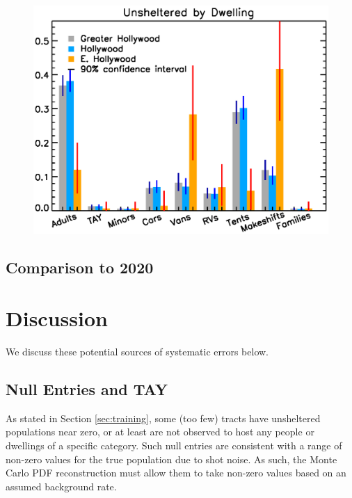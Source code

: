 \documentclass[11pt,twocolumn]{article}
\begin{document}
\begin{figure}[h]
	\centering
	\includegraphics[width =\linewidth]{allTracts/allBreakdownBar}
	\caption{}
\end{figure}

\subsection{Comparison to 2020}
\label{sec:comp}

\section{Discussion}
\label{sec:discussion}

We discuss these potential sources of systematic errors below.

\subsection{Null Entries and TAY}
\label{sec:nulls}

As stated in Section \ref{sec:training}, some (too few) tracts have unsheltered populations near zero, 
or at least are not observed to host any people or dwellings of a specific category. Such null entries 
are consistent with a range of non-zero values for the true population due to shot noise. As such, the 
Monte Carlo PDF reconstruction must allow them to take non-zero values based on an assumed background
rate. 
\end{document}
